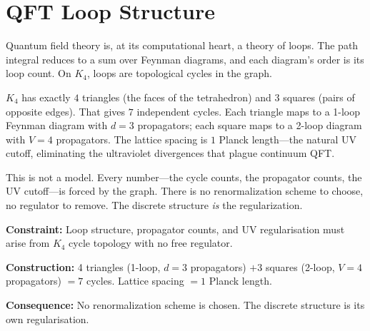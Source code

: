 \documentclass[11pt,a4paper]{book}
\newcommand{\VoidRef}[2]{\textit{#2} (in \textit{Void})}
\begin{document}
\chapter{QFT Loop Structure}
\label{ch:qft-loops}

Quantum field theory is, at its computational heart, a theory of loops. The path integral reduces to a sum over Feynman diagrams, and each diagram's order is its loop count. On $K_4$, loops are topological cycles in the graph.

$K_4$ has exactly $4$ triangles (the faces of the tetrahedron) and $3$ squares (pairs of opposite edges). That gives $7$ independent cycles. Each triangle maps to a 1-loop Feynman diagram with $d = 3$ propagators; each square maps to a 2-loop diagram with $V = 4$ propagators. The lattice spacing is $1$ Planck length---the natural UV cutoff, eliminating the ultraviolet divergences that plague continuum QFT.

This is not a model. Every number---the cycle counts, the propagator counts, the UV cutoff---is forced by the graph. There is no renormalization scheme to choose, no regulator to remove. The discrete structure \emph{is} the regularization.


\textbf{Constraint:} Loop structure, propagator counts, and UV regularisation must arise from $K_4$ cycle topology with no free regulator.

\textbf{Construction:} 4 triangles (1-loop, $d = 3$ propagators) $+ 3$ squares (2-loop, $V = 4$ propagators) $= 7$ cycles. Lattice spacing $= 1$ Planck length.

\textbf{Consequence:} No renormalization scheme is chosen. The discrete structure is its own regularisation.
\end{document}
